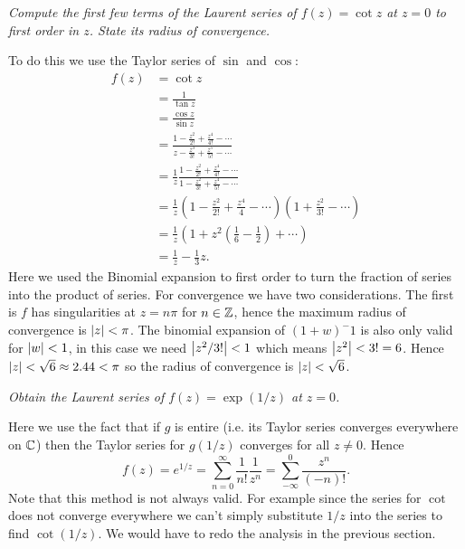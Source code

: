 \documentclass{article}
\begin{document}
    \begin{example}
        \emph{Compute the first few terms of the Laurent series of \(f(z) = \cot z\) at \(z = 0\) to first order in \(z\). State its radius of convergence.}
        
        To do this we use the Taylor series of \(\sin\) and \(\cos\):
        \begin{align*}
            f(z) &= \cot z\\
            &= \frac{1}{\tan z}\\
            &= \frac{\cos z}{\sin z}\\
            &= \frac{1 - \frac{z^2}{2!} + \frac{z^4}{4!} - \dotsb}{z - \frac{z^3}{3!} + \frac{z^5}{5!} - \dotsb}\\
            &= \frac{1}{z}\frac{1 - \frac{z^2}{2!} + \frac{z^4}{4!} - \dotsb}{1 - \frac{z^2}{3!} + \frac{z^4}{5!} - \dotsb}\\
            &= \frac{1}{z} \left( 1 - \frac{z^2}{2!} + \frac{z^4}{4} - \dotsb \right) \left( 1 + \frac{z^2}{3!} - \dotsb \right)\\
            &= \frac{1}{z} \left( 1 + z^2\left( \frac{1}{6} - \frac{1}{2} \right) + \dotsb \right)\\
            &= \frac{1}{z} - \frac{1}{3}z.
        \end{align*}
        Here we used the Binomial expansion to first order to turn the fraction of series into the product of series.
        For convergence we have two considerations.
        The first is \(f\) has singularities at \(z = n\pi\) for \(n\in\mathbb{Z}\), hence the maximum radius of convergence is \(\abs{z} < \pi\).
        The binomial expansion of \((1 + w)^-1\) is also only valid for \(\abs{w} < 1\), in this case we need \(\abs{z^2/3!} < 1\) which means \(\abs{z^2} < 3! = 6\).
        Hence \(\abs{z} < \sqrt{6} \approx 2.44 < \pi\) so the radius of convergence is \(\abs{z} < \sqrt{6}\).
    \end{example}
    \begin{example}
        \emph{Obtain the Laurent series of \(f(z) = \exp(1/z)\) at \(z = 0\).}
        
        Here we use the fact that if \(g\) is entire (i.e. its Taylor series converges everywhere on \(\mathbb{C}\)) then the Taylor series for \(g(1/z)\) converges for all \(z \ne 0\).
        Hence
        \[f(z) = e^{1/z} = \sum_{n=0}^{\infty}\frac{1}{n!}\frac{1}{z^n} = \sum_{-\infty}^{0} \frac{z^n}{(-n)!}.\]
        Note that this method is not always valid.
        For example since the series for \(\cot\) does not converge everywhere we can't simply substitute \(1/z\) into the series to find \(\cot(1/z)\).
        We would have to redo the analysis in the previous section.
    \end{example}
\end{document}
